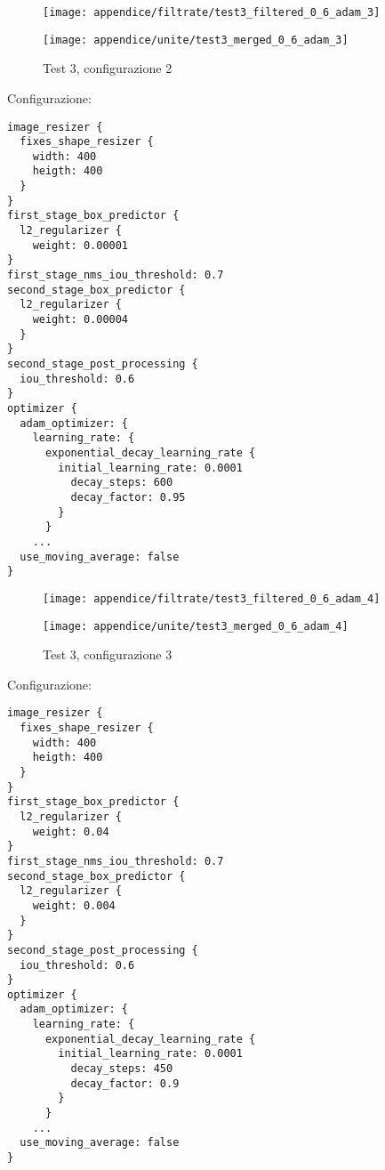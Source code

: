 \newpage
\begin{figure}[H]  
    \begin{minipage}{.5\columnwidth}  
        \centering  
        \texttt{[image: appendice/filtrate/test3\_filtered\_0\_6\_adam\_3]}  
    \end{minipage}%
    \begin{minipage}{0.5\columnwidth}  
        \centering  
        \texttt{[image: appendice/unite/test3\_merged\_0\_6\_adam\_3]}  
    \end{minipage}  
    \caption{Test 3, configurazione 2}
\end{figure}%
Configurazione:
\begin{multicols}{2}
    \begin{lstlisting}
image_resizer {
  fixes_shape_resizer {
    width: 400
    heigth: 400
  }
}
first_stage_box_predictor {
  l2_regularizer {
    weight: 0.00001
}
first_stage_nms_iou_threshold: 0.7
second_stage_box_predictor {
  l2_regularizer {
    weight: 0.00004
  }
}
second_stage_post_processing {
  iou_threshold: 0.6
}
optimizer {
  adam_optimizer: {
    learning_rate: {
      exponential_decay_learning_rate {
        initial_learning_rate: 0.0001
          decay_steps: 600
          decay_factor: 0.95
        }
      }
    ...
  use_moving_average: false
}
    \end{lstlisting}
\end{multicols}

\newpage
\begin{figure}[H]  
    \begin{minipage}{.5\columnwidth}  
        \centering  
        \texttt{[image: appendice/filtrate/test3\_filtered\_0\_6\_adam\_4]}  
    \end{minipage}%
    \begin{minipage}{0.5\columnwidth}  
        \centering  
        \texttt{[image: appendice/unite/test3\_merged\_0\_6\_adam\_4]}  
    \end{minipage}  
    \caption{Test 3, configurazione 3}
\end{figure}%
Configurazione:
\begin{multicols}{2}
    \begin{lstlisting}
image_resizer {
  fixes_shape_resizer {
    width: 400
    heigth: 400
  }
}
first_stage_box_predictor {
  l2_regularizer {
    weight: 0.04
}
first_stage_nms_iou_threshold: 0.7
second_stage_box_predictor {
  l2_regularizer {
    weight: 0.004
  }
}
second_stage_post_processing {
  iou_threshold: 0.6
}
optimizer {
  adam_optimizer: {
    learning_rate: {
      exponential_decay_learning_rate {
        initial_learning_rate: 0.0001
          decay_steps: 450
          decay_factor: 0.9
        }
      }
    ...
  use_moving_average: false
}
    \end{lstlisting}
\end{multicols}

